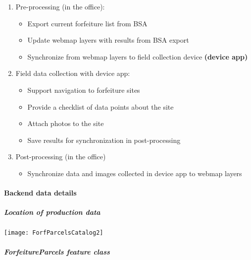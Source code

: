 \documentclass[class=article , crop=false, titlepage, twoside, multi={itemize, figure, verbatim}, float=false]{standalone}
\begin{document}
\begin{enumerate}

\item Pre-processing (in the office):
\begin{itemize}

\item Export current forfeiture list from BSA
\item Update webmap layers with results from BSA export
\item Synchronize from webmap layers to field collection device \textbf{(device app)}
\end{itemize}

\item Field data collection with device app:
\begin{itemize}

\item Support navigation to forfeiture sites
\item Provide a checklist of data points about the site
\item Attach photos to the site
\item Save results for synchronization in post-processing
\end{itemize}

\item Post-processing (in the office)
\begin{itemize}

\item Synchronize data and images collected in device app to webmap layers

\end{itemize}
\end{enumerate}

\paragraph{Backend data details}
\subparagraph{Location of production data}

\begin{center}
    \texttt{[image: ForfParcelsCatalog2]}
    \label{img:g}
\end{center}

\subparagraph{ForfeitureParcels feature class}
\end{document}
